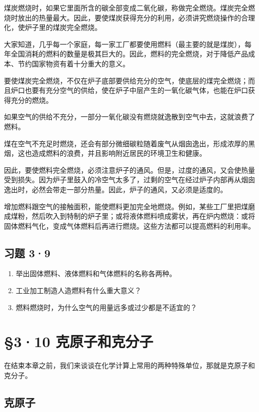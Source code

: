 煤炭燃烧时，如果它里面所含的碳全部变成二氧化碳，称做完全燃烧。煤炭完全燃烧时放出的热量最大。因此，要使煤炭获得充分的利用，必须讲究燃烧操作的合理化，使炉子里的煤炭完全燃烧。

大家知道，几乎每一个家庭，每一家工厂都要使用燃料（最主要的就是煤炭），每年全国消耗的燃料的数量是极其巨大的。因此，燃料的完全燃烧，对于降低产品成本、节约国家物资有着十分重大的意义。

要使煤炭完全燃烧，不仅在炉子底部要供给充分的空气，使底层的煤完全燃烧；而且炉口也要有充分空气的供给，使在炉子中层产生的一氧化碳气体，也能在炉口获得充分的燃烧。

如果空气的供给不充分，一部分一氧化碳没有燃烧就逸散到空气中去，这就浪费了燃料。

煤在空气不充足时燃烧，还会有部分微细碳粒随着废气从烟囱逸出，形成浓厚的黑烟，这也造成燃料的浪费，并且影响附近居民的环境卫生和健康。

因此，要使燃料完全燃烧，必须注意炉子的通风。但是，过度的通风，又会使热量受到损失。因为炉子里鼓入的冷空气太多了，过剩的空气在经过炉子内部再从烟囱逸出时，必然会带走一部分热量。因此，炉子的通风，又必须是适度的。

增加燃料跟空气的接触面积，能使燃料更加完全地燃烧。例如，某些工厂里把煤磨成煤粉，然后吹入到特制的炉子里；或将液体燃料喷成雾状，再在炉内燃烧：或将固体燃料气化，变成气体燃料后再进行燃烧。这些方法都可以提高燃料的利用率。

\subsection{习题 3·9}

\begin{enumerate}
\item
  举出固体燃料、液体燃料和气体燃料的名称各两种。
\item
  工业加工制造人造燃料有什么重大意义？
\item
  燃料燃烧时，为什么空气的用量远多或过少都是不适宜的？
\end{enumerate}

\section{§3·10 克原子和克分子}

在结束本章之前，我们来谈谈在化学计算上常用的两种特殊单位，那就是克原子和克分子。

\subsection{克原子}

